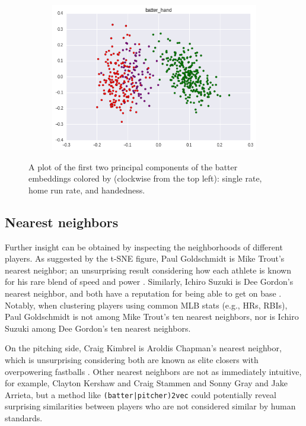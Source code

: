 \documentclass{article}
\begin{document}
\begin{figure}
    \begin{subfigure}{0.5\linewidth}
    \centering
    \includegraphics[width=1\linewidth]{batter_hand.png}
    \caption{}
    \end{subfigure}
\caption{A plot of the first two principal components of the batter embeddings colored by (clockwise from the top left): single rate, home run rate, and handedness.}
\label{fig:batter_traits}
\end{figure}

\subsection{Nearest neighbors}

Further insight can be obtained by inspecting the neighborhoods of different players. As suggested by the t-SNE figure, Paul Goldschmidt is Mike Trout's nearest neighbor; an unsurprising result considering how each athlete is known for his rare blend of speed and power \parencite{Kory2015}. Similarly, Ichiro Suzuki is Dee Gordon's nearest neighbor, and both have a reputation for being able to get on base \parencite{Sullivan2015}. Notably, when clustering players using common MLB stats (e.g., HRs, RBIs), Paul Goldschmidt is not among Mike Trout's ten nearest neighbors, nor is Ichiro Suzuki among Dee Gordon's ten nearest neighbors.

On the pitching side, Craig Kimbrel is Aroldis Chapman's nearest neighbor, which is unsurprising considering both are known as elite closers with overpowering fastballs \parencite{Mirsky2016}. Other nearest neighbors are not as immediately intuitive, for example, Clayton Kershaw and Craig Stammen and Sonny Gray and Jake Arrieta, but a method like \texttt{(batter|pitcher)2vec} could potentially reveal surprising similarities between players who are not considered similar by human standards.
\end{document}
